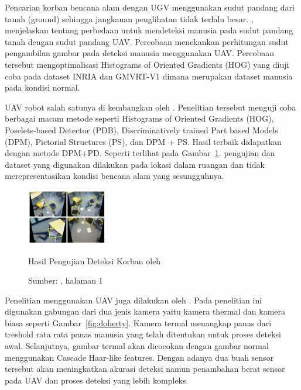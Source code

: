Pencarian korban bencana alam dengan UGV menggunakan sudut pandang dari tanah (ground) sehingga jangkauan penglihatan tidak terlalu besar. \citet{blondel2014human}, menjelaskan tentang perbedaan untuk mendeteksi manusia pada sudut pandang tanah dengan sudut pandang UAV. Percobaan menekankan perhitungan sudut pengambilan gambar pada deteksi manusia menggunakan UAV. Percobaan tersebut mengoptimalisasi Histograms of Oriented Gradients (HOG) yang diuji coba pada dataset INRIA dan GMVRT-V1 dimana merupakan dataset manusia pada kondisi normal.

UAV robot salah satunya di kembangkan oleh \citet{andriluka2010vision}. Penelitian tersebut menguji coba berbagai macam metode seperti Histograms of Oriented Gradients (HOG), Poselets-based Detector (PDB), Discriminatively trained Part based Models (DPM), Pictorial Structures (PS), dan DPM + PS. Hasil terbaik didapatkan dengan metode DPM+PD. Seperti terlihat pada Gambar~\ref{fig:andriluka}. pengujian dan dataset yang digunakan dilakukan pada lokasi dalam ruangan dan tidak merepresentasikan kondisi bencana alam yang sesungguhnya.

\begin{figure}[ht]
 \includegraphics[width=\textwidth]{andriluka}
 \caption{Hasil Pengujian Deteksi Korban oleh \cite{andriluka2010vision}}
  \caption*{Sumber: \citet{andriluka2010vision}, halaman 1}
 \label{fig:andriluka}   
\end{figure}

Penelitian menggunakan UAV juga dilakukan oleh \citet{doherty2007uav}. Pada penelitian ini digunakan gabungan dari dua jenis kamera yaitu kamera thermal dan kamera biasa seperti Gambar~\ref{fig:doherty}. Kamera termal menangkap panas dari treshold rata rata panas manusia yang telah ditentukan untuk proses deteksi awal. Selanjutnya, gambar termal akan dicocokan dengan gambar normal menggunakan Cascade Haar-like features. Dengan adanya dua buah sensor tersebut akan meningkatkan akurasi deteksi namun  penambahan berat sensor pada UAV dan proses deteksi yang lebih kompleks.

